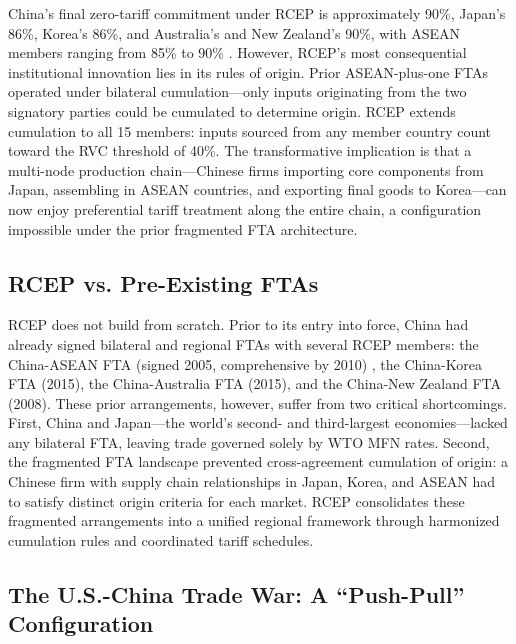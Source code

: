 \documentclass[preprint,12pt,authoryear]{elsarticle}
\begin{document}
China's final zero-tariff commitment under RCEP is approximately 90\%, Japan's 86\%, Korea's 86\%, and Australia's and New Zealand's 90\%, with ASEAN members ranging from 85\% to 90\% \cite{zhang2021rcep}. However, RCEP's most consequential institutional innovation lies in its rules of origin. Prior ASEAN-plus-one FTAs operated under bilateral cumulation—only inputs originating from the two signatory parties could be cumulated to determine origin. RCEP extends cumulation to all 15 members: inputs sourced from any member country count toward the RVC threshold of 40\%. The transformative implication is that a multi-node production chain—Chinese firms importing core components from Japan, assembling in ASEAN countries, and exporting final goods to Korea—can now enjoy preferential tariff treatment along the entire chain, a configuration impossible under the prior fragmented FTA architecture.

\subsection{RCEP vs. Pre-Existing FTAs}

RCEP does not build from scratch. Prior to its entry into force, China had already signed bilateral and regional FTAs with several RCEP members: the China-ASEAN FTA (signed 2005, comprehensive by 2010) \cite{shen2011china}, the China-Korea FTA (2015), the China-Australia FTA (2015), and the China-New Zealand FTA (2008). These prior arrangements, however, suffer from two critical shortcomings. First, China and Japan—the world's second- and third-largest economies—lacked any bilateral FTA, leaving trade governed solely by WTO MFN rates. Second, the fragmented FTA landscape prevented cross-agreement cumulation of origin: a Chinese firm with supply chain relationships in Japan, Korea, and ASEAN had to satisfy distinct origin criteria for each market. RCEP consolidates these fragmented arrangements into a unified regional framework through harmonized cumulation rules and coordinated tariff schedules.

\subsection{The U.S.-China Trade War: A ``Push-Pull'' Configuration}
\end{document}

